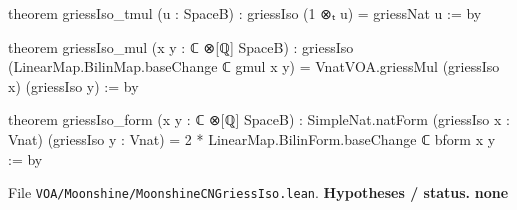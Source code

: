 \documentclass[11pt,openany]{book}
\newcommand{\leanpath}[1]{\texttt{\small #1}}
\theoremstyle{definition}
\theoremstyle{plain}
\begin{document}
\begin{leancode}
theorem griessIso_tmul (u : SpaceB) : griessIso (1 ⊗ₜ u) = griessNat u := by
\end{leancode}
\begin{leancode}
theorem griessIso_mul (x y : ℂ ⊗[ℚ] SpaceB) :
    griessIso (LinearMap.BilinMap.baseChange ℂ gmul x y)
      = VnatVOA.griessMul (griessIso x) (griessIso y) := by
\end{leancode}
\begin{leancode}
theorem griessIso_form (x y : ℂ ⊗[ℚ] SpaceB) :
    SimpleNat.natForm (griessIso x : Vnat) (griessIso y : Vnat)
      = 2 * LinearMap.BilinForm.baseChange ℂ bform x y := by
\end{leancode}
\noindent File \leanpath{VOA/\allowbreak Moonshine/\allowbreak MoonshineCNGriessIso.lean}.
\noindent\textbf{Hypotheses / status.} \textbf{none}\par
\medskip
\endgroup
\end{document}
